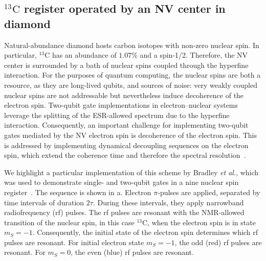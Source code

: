 \subsection*{$^{13}\mathrm{C}$ register operated by an NV center in diamond}

Natural-abundance diamond hosts carbon isotopes with non-zero nuclear spin. In particular, $^{13}\mathrm{C}$ has an abundance of $1.07$\% and a spin-1/2. Therefore, the NV center is surrounded by a bath of nuclear spins coupled through the hyperfine interaction. For the purposes of quantum computing, the nuclear spins are both a resource, as they are long-lived qubits, and sources of noise: very weakly coupled nuclear spins are not addressable but nevertheless induce decoherence of the electron spin. Two-qubit gate implementations in electron--nuclear systems leverage the splitting of the ESR-allowed spectrum due to the hyperfine interaction. Consequently, an important challenge for implementing two-qubit gates mediated by the NV electron spin is decoherence of the electron spin. This is addressed by implementing dynamical decoupling sequences on the electron spin, which extend the coherence time and therefore the spectral resolution~.

We highlight a particular implementation of this scheme by Bradley \textit{et al.}, which was used to demonstrate single- and two-qubit gates in a nine nuclear spin register~. The sequence is shown in a. Electron $\pi$-pulses are applied, separated by time intervals of duration $2\tau$. During these intervals, they apply narrowband radiofrequency (rf) pulses. The rf pulses are resonant with the NMR-allowed transition of the nuclear spin, in this case $^{13}\mathrm{C}$, when the electron spin is in state $m_S=-1$. Consequently, the initial state of the electron spin determines which rf pulses are resonant. For initial electron state $m_S=-1$, the odd (red) rf pulses are resonant. For $m_S=0$, the even (blue) rf pulses are resonant.

